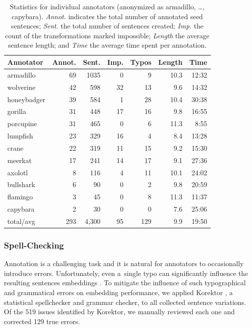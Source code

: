 \begin{table}[tb]
\centering
\begin{tabular}{lrrrrrr}
\toprule
\textbf{Annotator}     
& \textbf{Annot.} 
& \textbf{Sent.} 
& \textbf{Imp.} 
& \textbf{Typos} 
& \textbf{Length} 
& \textbf{Time}  \\
\midrule
armadillo    & 69     & 1035  & 0  & 9  & 10.3   & 12:32        \\
wolverine    & 42     & 598   & 32 & 13 & 9.6    & 14:32        \\
honeybadger  & 39     & 584   & 1  & 28 & 10.4   & 30:38        \\
gorilla      & 31     & 448   & 17 & 16 & 9.8    & 16:55        \\
porcupine    & 31     & 465   & 0  & 6  & 11.3   & 8:55         \\
lumpfish     & 23     & 329   & 16 & 4  & 8.4    & 13:28        \\
crane        & 22     & 319   & 11 & 15 & 9.2    & 15:30        \\
meerkat      & 17     & 241   & 14 & 17 & 9.1    & 27:36        \\
axolotl      & 8      & 116   & 4  & 11 & 10.1   & 24:02        \\
bullshark    & 6      & 90    & 0  & 2  & 9.8    & 20:59        \\
flamingo     & 3      & 45    & 0  & 8  & 11.3   & 11:37        \\
capybara     & 2      & 30    & 0  & 0  & 7.6    & 25:06         \\
\midrule
total/avg   & 293    & 4,300 & 95 & 129  & 9.9    & 19:50       \\
\bottomrule
\end{tabular}
\caption{Statistics for individual annotators (anonymized as armadillo, \dots{}, capybara). \textit{Annot.} indicates the total number of annotated seed sentences; \textit{Sent.} the total number of sentences created; \textit{Imp.} the count of the  transformations marked impossible; \textit{Length} the average sentence length; and \textit{Time} the average time spent per annotation.}
\label{tab:statistics}
\end{table}


\subsubsection{Spell-Checking}
Annotation is a challenging task and it is natural for annotators to occasionally introduce errors. Unfortunately, even a~single typo can significantly influence the resulting sentences embeddings \citep{malykh-etal-2018-robust}. To mitigate the influence of such typographical and grammatical errors on embedding performance, we applied Korektor \citep{richter12}, a statistical spellchecker and grammar checker, to all collected sentence variations. Of the 519 issues identified by Korektor, we manually reviewed each one and corrected 129 true errors.

